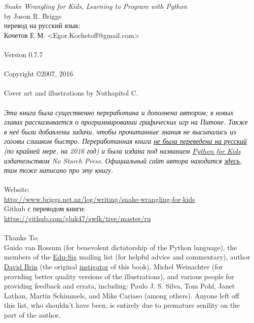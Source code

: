 \noindent
\textsf{\emph{Snake Wrangling for Kids, Learning to Program with Python}}\\
by Jason R. Briggs\\
перевод на русский язык:\\
Кочетов Е.\,М. <Egor.Kochetoff@gmail.com>\\
\\
Version 0.7.7
\\\\
Copyright \copyright 2007, 2016\\
\\
Cover art and illustrations by Nuthapitol C.\\
\\
\noindent
\textsf{\emph{Эта книга была существенно переработана и дополнена автором; в новых главах рассказывается о программировании графических игр на Питоне. Также в неё были добавлены задачи, чтобы прочитанные знания не высыпались из головы слишком быстро. Переработанная книга \href{https://toster.ru/q/50630}{не была переведена на русский} (по крайней мере, на 2016 год) и была издана под названием \href{http://nostarch.com/pythonforkids}{Python for Kids} издательством No Starch Press. Официальный сайт автора находится \href{http://jasonrbriggs.com/python-for-kids/}{здесь}, там тоже написано про эту книгу.}}
\\
\\
\linebreak
\noindent
Website:\\ \href{http://www.briggs.net.nz/log/writing/snake-wrangling-for-kids}{http://www.briggs.net.nz/log/writing/snake-wrangling-for-kids}\\
Github с переводом книги:\\
\url{https://github.com/gluk47/swfk/tree/master/ru}\\
\\
\noindent
Thanks To:\\
Guido van Rossum (for benevolent dictatorship of the Python language), the members of the \href{http://www.python.org/community/sigs/current/edu-sig/}{Edu-Sig} mailing list (for helpful advice and commentary), author \href{http://www.davidbrin.com/}{David Brin} (the original \href{http://www.salon.com/tech/feature/2006/09/14/basic/}{instigator} of this book), Michel Weinachter (for providing better quality versions of the illustrations), and various people for providing feedback and errata, including: Paulo J. S. Silva, Tom Pohl, Janet Lathan, Martin Schimmels, and Mike Cariaso (among others).  Anyone left off this list, who shouldn't have been, is entirely due to premature senility on the part of the author.\\

